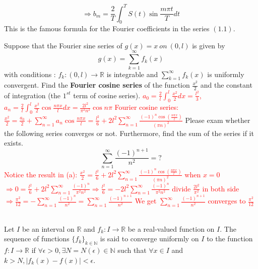 \documentclass[a4 paper]{article}
\begin{document}
$$\Rightarrow b_m=\frac{2}{T}\int_0^T S(t)\sin{\frac{m\pi t}{T}}dt$$ This is the famous formula for the Fourier coefficients in the series $(1.1)$.
\newline
\begin{tcolorbox}[colback=RubineRed!5!white,colframe=RubineRed!75!black]
Suppose that the Fourier sine series of $g(x)=x \ on \ (0,l)$ is given by
\begin{equation}
    g(x)=\sum_{k=1}^{\infty} f_k(x)
\end{equation}
with conditions : $f_k:(0,l)\rightarrow\mathbb{R}$ is integrable and $\sum_{k=1}^\infty f_k(x)$ is uniformly convergent.
 Find the \textbf{Fourier cosine series} of the function $\frac{x^2}{2}$ and the constant of integration (the $1^{st}$ term of cosine series).
\newline
\textcolor{red}{$a_0=\frac{2}{l}\int_0^l \frac{x^2}{2}dx=\frac{l^2}{3}$, $ a_n=\frac{2}{l}\int_0^l \frac{x^2}{2}\cos{\frac{n\pi x}{l}}dx=\frac{2l^2}{\pi^2n^2}\cos{n\pi}$}
\newline
\textcolor{red}{Fourier cosine series: $\frac{x^2}{2}=\frac{a_0}{2}+\sum_{n=1}^{\infty} {a_n\cos{\frac{n\pi x}{l}}} = \frac{l^2}{6}+2l^2\sum_{n=1}^{\infty}\frac{(-1)^n\cos(\frac{n\pi x}{l})}{(\pi n)^2}$}
 Please exam whether the following series converges or not. Furthermore, find the sum of the series if it exists.
\begin{equation}
    \sum_{n=1}^\infty \frac{(-1)^{n+1}}{n^2}=?
\end{equation}
\newline
\textcolor{red}{Notice the result in (a): $\frac{x^2}{2}= \frac{l^2}{6}+2l^2\sum_{n=1}^{\infty}\frac{(-1)^n\cos(\frac{n\pi x}{l})}{(\pi n)^2}$}
\newline
\textcolor{red}{when $x=0$ $\Rightarrow 0= \frac{l^2}{6}+2l^2\sum_{n=1}^{\infty}\frac{(-1)^n}{\pi^2 n^2}\Rightarrow \frac{l^2}{6}=-2l^2\sum_{n=1}^{\infty}\frac{(-1)^n}{\pi^2 n^2}$}
\newline
\textcolor{red}{divide $\frac{2l^2}{\pi^2}$ in both side $\Rightarrow \frac{\pi^2}{12}=-\sum_{n=1}^{\infty}\frac{(-1)^n}{n^2}=\sum_{n=1}^{\infty}\frac{(-1)^{n+1}}{n^2}$}
\newline
\textcolor{red}{We get $\sum_{n=1}^{\infty}\frac{(-1)^{n+1}}{n^2}$ converges to $\frac{\pi^2}{12}$}
\end{tcolorbox}
\begin{tcolorbox}[colback=RoyalBlue!5!white,colframe=RoyalBlue!75!black]%
\\
Let $I$ be an interval on $\mathbb{R}$ and $f_k : I\rightarrow\mathbb{R}$ be a real-valued function on $I$. The sequence of functions $\{f_k\}_{k\in\mathbb{N}}$ is said to converge uniformly on $I$ to the function $f:I\rightarrow\mathbb{R}$ if $\forall\epsilon> 0,\exists N = N(\epsilon) \in\mathbb{N}$ such that $\forall x \in I$ and $k > N,|f_k(x)-f(x)| < \epsilon$.
\end{tcolorbox}
\end{document}
